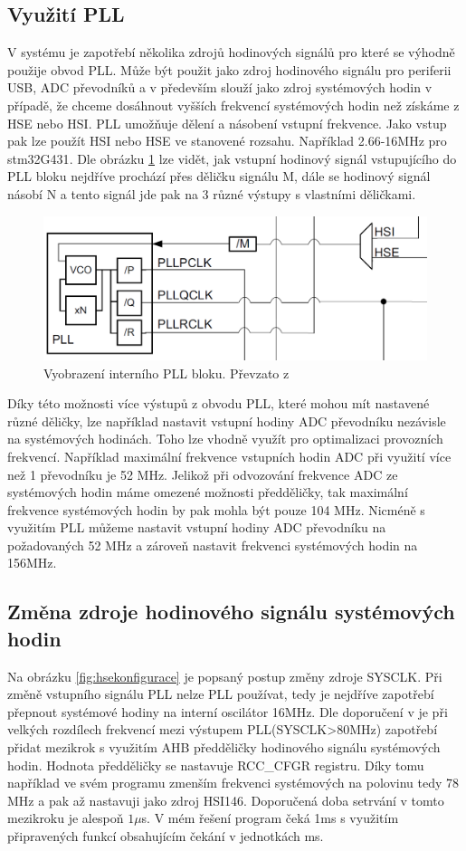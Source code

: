 \subsection{Využití PLL}
V systému je zapotřebí několika zdrojů hodinových signálů pro které se výhodně použije obvod PLL. Může být použit jako zdroj hodinového signálu pro periferii USB, ADC převodníků a v především slouží jako zdroj systémových hodin v případě, že chceme dosáhnout vyšších frekvencí systémových hodin než získáme z HSE nebo HSI. PLL umožňuje dělení a násobení vstupní frekvence. Jako vstup pak lze použít HSI nebo HSE ve stanovené rozsahu. Například 2.66-16MHz  pro stm32G431\cite{dataG431}. Dle obrázku \ref{fig:plldiagram} lze vidět, jak vstupní hodinový signál vstupujícího do PLL bloku  nejdříve prochází přes děličku signálu M, dále se hodinový signál násobí N a tento signál jde pak na 3 různé výstupy s vlastními děličkami. 

\begin{figure}[H]
	\centering
	\includegraphics[width=0.6\linewidth]{Figs/Documentation/PLL_Diagram}
	\caption{Vyobrazení interního PLL bloku. Převzato z}
	\label{fig:plldiagram}
\end{figure}    

Díky této možnosti více výstupů z obvodu PLL, které mohou mít nastavené různé děličky, lze například nastavit vstupní hodiny ADC převodníku nezávisle na systémových hodinách. Toho lze vhodně využít pro optimalizaci provozních frekvencí. Například maximální frekvence vstupních hodin ADC při využití více než 1 převodníku je 52 MHz. Jelikož při odvozování frekvence ADC ze systémových hodin máme omezené možnosti předděličky, tak maximální frekvence systémových hodin by pak mohla být pouze 104 MHz. Nicméně s využitím PLL můžeme nastavit vstupní hodiny ADC převodníku na požadovaných 52 MHz a zároveň nastavit frekvenci systémových hodin na 156MHz. 

\subsection{Změna zdroje hodinového signálu systémových hodin}
Na obrázku \ref{fig:hsekonfigurace} je popsaný postup změny zdroje SYSCLK. Při změně vstupního signálu PLL nelze PLL používat, tedy je nejdříve zapotřebí přepnout systémové hodiny na interní oscilátor 16MHz. Dle doporučení v \cite{refG4} je při velkých rozdílech frekvencí mezi výstupem PLL(SYSCLK>80MHz) zapotřebí přidat mezikrok s využitím AHB předděličky hodinového signálu systémových hodin. Hodnota předděličky se nastavuje RCC\_CFGR registru. Díky tomu například ve svém programu zmenším frekvenci systémových na polovinu tedy 78 MHz a pak až nastavuji jako zdroj HSI146. Doporučená doba setrvání v tomto mezikroku je alespoň $1\mu$s. V mém řešení program čeká 1ms s využitím připravených funkcí obsahujícím čekání v jednotkách ms.


